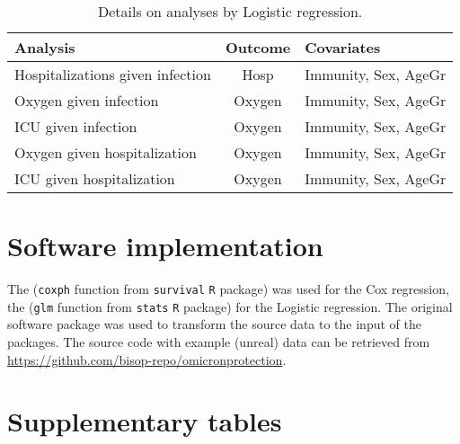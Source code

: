 \documentclass[9pt,onecolumn,twoside,lineno]{pnas-new}
\begin{document}
\begin{table}
\caption{Details on analyses by Logistic regression. \vspace{1mm}}
\centering
\begin{tabular}{lcl}
\hline
Analysis & Outcome & Covariates \\ 
\hline
Hospitalizations given infection & Hosp & 
Immunity, Sex, AgeGr \\
Oxygen given infection & Oxygen & 
Immunity, Sex, AgeGr \\
ICU given infection & Oxygen & 
Immunity, Sex, AgeGr \\
Oxygen given hospitalization & Oxygen & 
Immunity, Sex, AgeGr \\
ICU given hospitalization& Oxygen & 
Immunity, Sex, AgeGr \\
\hline
\end{tabular}
\label{tab:lrs}
\end{table}

\section*{Software implementation}

The ({\tt coxph} function from {\tt survival} {\tt R} package) was used for the Cox regression, the ({\tt glm} function from {\tt stats} {\tt R} package) for the Logistic regression. The original software package was used to transform the source data to the input of the packages. The source code with example (unreal) data can be retrieved from \url{https://github.com/bisop-repo/omicronprotection}.


\clearpage

\section*{Supplementary tables}
\end{document}
